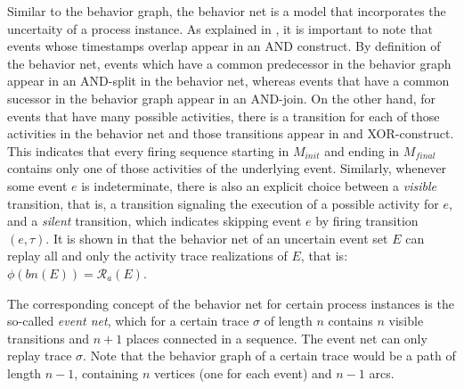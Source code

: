 Similar to the behavior graph, the behavior net is a model that incorporates the uncertaity of a process instance.
As explained in \cite{conformance}, it is important to note that events whose timestamps overlap appear in an AND construct.
By definition of the behavior net, events which have a common predecessor in the behavior graph appear in an AND-split in the behavior net, whereas events that have a common sucessor in the behavior graph appear in an AND-join.
On the other hand, for events that have many possible activities, there is a transition for each of those activities in the behavior net and those transitions appear in and XOR-construct.
This indicates that every firing sequence starting in $M_{init}$ and ending in $M_{final}$ contains only one of those activities of the underlying event.
Similarly, whenever some event $e$ is indeterminate, there is also an explicit choice between a \textit{visible} transition, that is, a transition signaling the execution of a possible activity for $e$, and a \textit{silent} transition, which indicates skipping event $e$ by firing transition $(e,\tau)$.
It is shown in \cite{conformance} that the behavior net of an uncertain event set $E$ can replay all and only the activity trace realizations of $E$, that is: $\phi(bn(E)) = \mathcal{R}_a(E)$. 

The corresponding concept of the behavior net for certain process instances is the so-called \textit{event net}, which for a certain trace $\sigma$ of length $n$ contains $n$ visible transitions and $n+1$ places connected in a sequence.
The event net can only replay trace $\sigma$.
Note that the behavior graph of a certain trace would be a path of length $n-1$, containing $n$ vertices (one for each event) and $n-1$ arcs.\\

